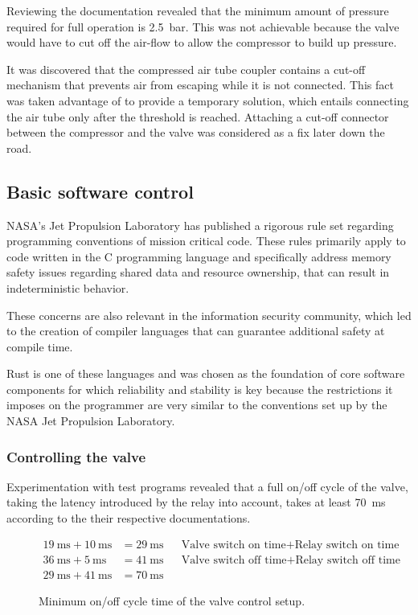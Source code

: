 Reviewing the documentation revealed that the minimum amount of pressure required for full operation is \SI{2,5}{\bar}. This was not achievable because the valve would have to cut off the air-flow to allow the compressor to build up pressure.

It was discovered that the compressed air tube coupler contains a cut-off mechanism that prevents air from escaping while it is not connected. This fact was taken advantage of to provide a temporary solution, which entails connecting the air tube only after the threshold is reached. Attaching a cut-off connector between the compressor and the valve was considered as a fix later down the road.


\subsection{Basic software control}
NASA's Jet Propulsion Laboratory \cite{jpl} has published a rigorous rule set \cite{jpl-rules} regarding programming conventions of mission critical code. These rules primarily apply to code written in the C programming language and specifically address memory safety issues regarding shared data and resource ownership, that can result in indeterministic behavior. 

These concerns are also relevant in the information security community, which led to the creation of compiler languages that can guarantee additional safety at compile time. 

Rust \cite{rust} is one of these languages and was chosen as the foundation of core software components for which reliability and stability is key because the restrictions it imposes on the programmer are very similar to the conventions set up by the NASA Jet Propulsion Laboratory.

\subsubsection{Controlling the valve}
Experimentation with test programs revealed that a full on/off cycle of the valve, taking the latency introduced by the relay into account, takes at least \SI{70}{\milli\second} according to the their respective documentations. 
\begin{figure}[h]
\begin{align*}
    \SI{19}{\milli\second} + \SI{10}{\milli\second} &=\SI{29}{\milli\second} && \text{Valve switch on time} + \text{Relay switch on time} \\
    \SI{36}{\milli\second} + \SI{5}{\milli\second}  &=\SI{41}{\milli\second} && \text{Valve switch off time} + \text{Relay switch off time}\\
    \SI{29}{\milli\second} + \SI{41}{\milli\second} &=\SI{70}{\milli\second} 
\end{align*}
\caption{Minimum on/off cycle time of the valve control setup.}
\end{figure}

